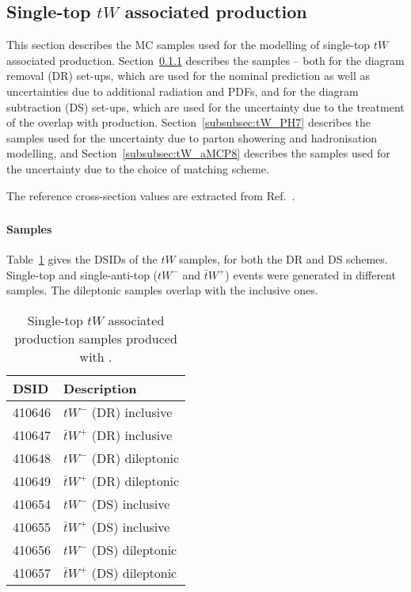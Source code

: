 \subsection{Single-top \texorpdfstring{$tW$}{tW} associated production}
\label{subsec:tW}

This section describes the MC samples used for the modelling of single-top $tW$ associated production.
Section~\ref{subsubsec:tW_PP8} describes the \POWPY[8] samples -- both for the diagram removal (DR) set-ups,
which are used for the nominal prediction as well as uncertainties due to additional radiation and PDFs,  
and for the diagram subtraction (DS) set-ups, which are used for the uncertainty due to the treatment 
of the overlap with \ttbar production. 
Section~\ref{subsubsec:tW_PH7} describes the \POWHER[7] samples used for the uncertainty 
due to parton showering and hadronisation modelling, and Section~\ref{subsubsec:tW_aMCP8} describes the 
\MGNLOPY[8] samples used for the uncertainty due to the choice of matching scheme.

The reference cross-section values are extracted from Ref.~\cite{LHCTopWGsgtopXsec}.

\subsubsection[Powheg+Pythia8]{\POWPY[8]}
\label{subsubsec:tW_PP8}

\paragraph{Samples}

Table~\ref{tab:tW_PP8} gives the DSIDs of the $tW$ \POWPY[8] samples, for both the DR and DS schemes.
Single-top and single-anti-top ($tW^-$ and $\bar{t}W^+$) events were generated in different samples.
The dileptonic samples overlap with the inclusive ones.

\begin{table}[htbp]
  \caption{Single-top $tW$ associated production samples produced with \POWPY[8].}%
  \label{tab:tW_PP8}
  \centering
  \begin{tabular}{l l}
    \toprule
    DSID & Description \\
    \midrule
    410646 & $tW^-$ (DR) inclusive \\
    410647 & $\bar{t}W^+$ (DR) inclusive \\
    410648 & $tW^-$ (DR) dileptonic \\
    410649 & $\bar{t}W^+$ (DR) dileptonic \\
    \midrule
    410654 & $tW^-$ (DS) inclusive \\
    410655 & $\bar{t}W^+$ (DS) inclusive \\
    410656 & $tW^-$ (DS) dileptonic \\
    410657 & $\bar{t}W^+$ (DS) dileptonic \\
    \bottomrule
  \end{tabular}
\end{table}


